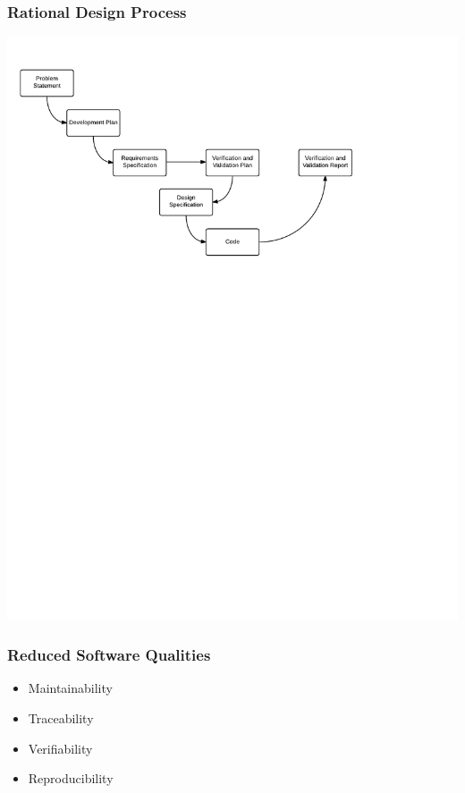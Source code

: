 \documentclass{beamer}
\begin{document}
\begin{frame}

\frametitle{Rational Design Process}
\begin{center}
\includegraphics[width=1.02\textwidth]{OverviewOfProcess.pdf}
\end{center}

\end{frame}

\begin{frame}

\frametitle{Reduced Software Qualities}

\begin{itemize}
\item{Maintainability}
\item{Traceability}
\item{Verifiability}
\item{Reproducibility}
\end{itemize}

\end{frame}
\end{document}
